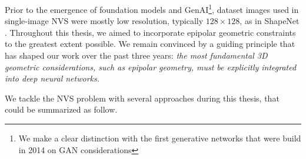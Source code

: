 Prior to the emergence of foundation models \citep{awais2023foundational} and \ac{GenAI}\footnote{We make a clear distinction with the first generative networks that were build in 2014 on \ac{GAN} \citep{goodfellow2014generative} considerations}, dataset images used in single-image \ac{NVS} were mostly low resolution, typically $128\times128$, as in ShapeNet \citep{chang2015shapenet}. Throughout this thesis, we aimed to incorporate epipolar geometric constraints to the greatest extent possible. We remain convinced by a guiding principle that has shaped our work over the past three years: \textit{the most fundamental 3D geometric considerations, such as epipolar geometry, must be explicitly integrated into deep neural networks.}

We tackle the \ac{NVS} problem with several approaches during this thesis, that could be summarized as follow.

